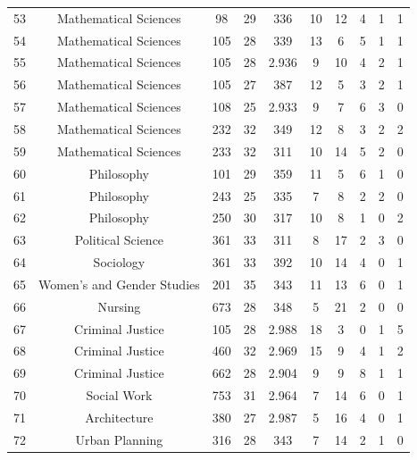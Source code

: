 \documentclass[12pt,letterpaper,oneside,openany]{book}
\begin{document}
\begin{center}
\begin{longtable}{c||ccccccccc}
53 & Mathematical Sciences           & 98    & 29                & 336 & 10 & 12 & 4 & 1 & 1 \\
54 & Mathematical Sciences           & 105   & 28                & 339 & 13 & 6  & 5 & 1 & 1 \\
55 & Mathematical Sciences           & 105   & 28                & 2.936 & 9  & 10 & 4 & 2 & 1 \\
56 & Mathematical Sciences           & 105   & 27                & 387 & 12 & 5  & 3 & 2 & 1 \\
57 & Mathematical Sciences           & 108   & 25                & 2.933 & 9  & 7  & 6 & 3 & 0 \\
58 & Mathematical Sciences           & 232   & 32                & 349 & 12 & 8  & 3 & 2 & 2 \\
59 & Mathematical Sciences           & 233   & 32                & 311 & 10 & 14 & 5 & 2 & 0 \\
60 & Philosophy                      & 101   & 29                & 359 & 11 & 5  & 6 & 1 & 0 \\
61 & Philosophy                      & 243   & 25                & 335 & 7  & 8  & 2 & 2 & 0 \\
62 & Philosophy                      & 250   & 30                & 317 & 10 & 8  & 1 & 0 & 2 \\
63 & Political Science               & 361   & 33                & 311 & 8  & 17 & 2 & 3 & 0 \\
64 & Sociology                       & 361   & 33                & 392 & 10 & 14 & 4 & 0 & 1 \\
65 & Women's and Gender Studies      & 201   & 35                & 343 & 11 & 13 & 6 & 0 & 1 \\
66 & Nursing                         & 673   & 28                & 348 & 5  & 21 & 2 & 0 & 0 \\
67 & Criminal Justice                & 105   & 28                & 2.988 & 18 & 3  & 0 & 1 & 5 \\
68 & Criminal Justice                & 460   & 32                & 2.969 & 15 & 9  & 4 & 1 & 2 \\
69 & Criminal Justice                & 662   & 28                & 2.904 & 9  & 9  & 8 & 1 & 1 \\
70 & Social Work                     & 753   & 31                & 2.964 & 7  & 14 & 6 & 0 & 1 \\
71 & Architecture                    & 380   & 27                & 2.987 & 5  & 16 & 4 & 0 & 1 \\
72 & Urban Planning                  & 316   & 28                & 343 & 7  & 14 & 2 & 1 & 0
	\end{longtable}
\end{center}
\end{document}
